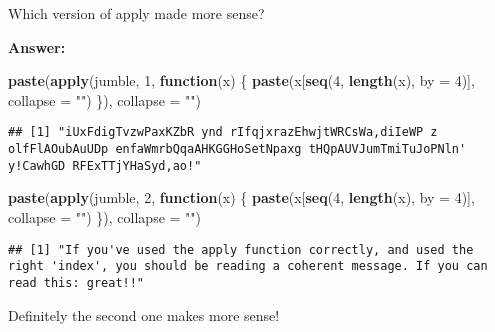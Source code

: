 \documentclass[]{article}
\newenvironment{Shaded}{\begin{snugshade}}{\end{snugshade}}
\newcommand{\ControlFlowTok}[1]{\textcolor[rgb]{0.13,0.29,0.53}{\textbf{#1}}}
\newcommand{\DataTypeTok}[1]{\textcolor[rgb]{0.13,0.29,0.53}{#1}}
\newcommand{\DecValTok}[1]{\textcolor[rgb]{0.00,0.00,0.81}{#1}}
\newcommand{\KeywordTok}[1]{\textcolor[rgb]{0.13,0.29,0.53}{\textbf{#1}}}
\newcommand{\NormalTok}[1]{#1}
\newcommand{\StringTok}[1]{\textcolor[rgb]{0.31,0.60,0.02}{#1}}
\begin{document}
Which version of apply made more sense?

\textbf{Answer:}

\begin{Shaded}
\begin{Highlighting}[]
\KeywordTok{paste}\NormalTok{(}\KeywordTok{apply}\NormalTok{(jumble, }\DecValTok{1}\NormalTok{, }\ControlFlowTok{function}\NormalTok{(x) \{}
  \KeywordTok{paste}\NormalTok{(x[}\KeywordTok{seq}\NormalTok{(}\DecValTok{4}\NormalTok{, }\KeywordTok{length}\NormalTok{(x), }\DataTypeTok{by =} \DecValTok{4}\NormalTok{)], }\DataTypeTok{collapse =} \StringTok{""}\NormalTok{)}
\NormalTok{\}), }\DataTypeTok{collapse =} \StringTok{""}\NormalTok{)}
\end{Highlighting}
\end{Shaded}

\begin{verbatim}
## [1] "iUxFdigTvzwPaxKZbR ynd rIfqjxrazEhwjtWRCsWa,diIeWP z olfFlAOubAuUDp enfaWmrbQqaAHKGGHoSetNpaxg tHQpAUVJumTmiTuJoPNln' y!CawhGD RFExTTjYHaSyd,ao!"
\end{verbatim}

\begin{Shaded}
\begin{Highlighting}[]
\KeywordTok{paste}\NormalTok{(}\KeywordTok{apply}\NormalTok{(jumble, }\DecValTok{2}\NormalTok{, }\ControlFlowTok{function}\NormalTok{(x) \{}
  \KeywordTok{paste}\NormalTok{(x[}\KeywordTok{seq}\NormalTok{(}\DecValTok{4}\NormalTok{, }\KeywordTok{length}\NormalTok{(x), }\DataTypeTok{by =} \DecValTok{4}\NormalTok{)], }\DataTypeTok{collapse =} \StringTok{""}\NormalTok{)}
\NormalTok{\}), }\DataTypeTok{collapse =} \StringTok{""}\NormalTok{)}
\end{Highlighting}
\end{Shaded}

\begin{verbatim}
## [1] "If you've used the apply function correctly, and used the right 'index', you should be reading a coherent message. If you can read this: great!!"
\end{verbatim}

Definitely the second one makes more sense!
\end{document}

